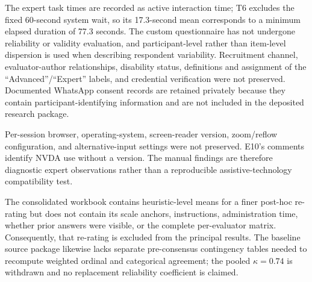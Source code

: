 \documentclass[10pt]{article}
\begin{document}
The expert task times are recorded as active interaction time; T6 excludes the fixed 60-second system wait, so its 17.3-second mean corresponds to a minimum elapsed duration of 77.3 seconds. The custom questionnaire has not undergone reliability or validity evaluation, and participant-level rather than item-level dispersion is used when describing respondent variability. Recruitment channel, evaluator-author relationships, disability status, definitions and assignment of the ``Advanced''/``Expert'' labels, and credential verification were not preserved. Documented WhatsApp consent records are retained privately because they contain participant-identifying information and are not included in the deposited research package.

Per-session browser, operating-system, screen-reader version, zoom/reflow configuration, and alternative-input settings were not preserved. E10's comments identify NVDA use without a version. The manual findings are therefore diagnostic expert observations rather than a reproducible assistive-technology compatibility test.

The consolidated workbook contains heuristic-level means for a finer post-hoc re-rating but does not contain its scale anchors, instructions, administration time, whether prior answers were visible, or the complete per-evaluator matrix. Consequently, that re-rating is excluded from the principal results. The baseline source package likewise lacks separate pre-consensus contingency tables needed to recompute weighted ordinal and categorical agreement; the pooled $\kappa=0.74$ is withdrawn and no replacement reliability coefficient is claimed.
\end{document}
